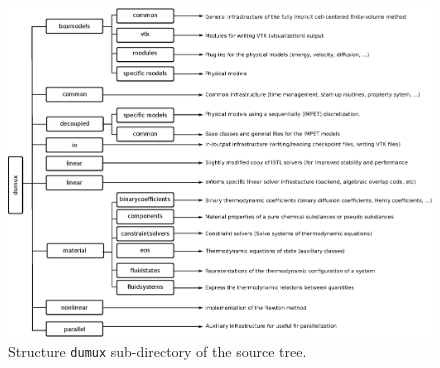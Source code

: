 \begin{landscape}
\begin{figure}[hbt]
  \centering 
  \includegraphics[width=\linewidth, keepaspectratio]{EPS/ewoms_structure.eps}
  \caption{
    \label{fig:dumux-structure}
    Structure \texttt{dumux} sub-directory of the \eWoms source tree.
  }
\end{figure}
\end{landscape}

